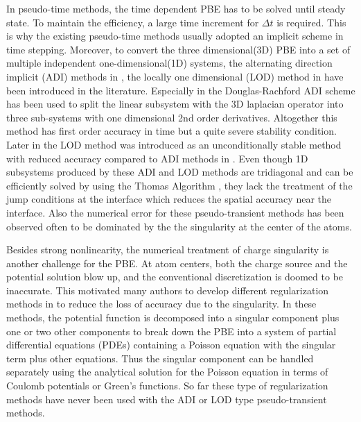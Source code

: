 In pseudo-time methods, the time dependent PBE has to be solved until steady state. To maintain the efficiency, a large time increment for  $\Delta t$ is required. This is why the existing pseudo-time methods usually adopted an implicit scheme in time stepping. Moreover, to convert the three dimensional(3D) PBE into a set of multiple independent one-dimensional(1D) systems, the alternating direction implicit (ADI) methods in \cite{Geng2013_tree,Geng2013_Fully}, the locally one dimensional (LOD) method in \cite{Wilson2016} have been introduced in the literature. Especially in \cite{Geng2013_Fully} the Douglas-Rachford ADI scheme has been used to split the linear subsystem with the 3D laplacian operator into three sub-systems with one dimensional 2nd order derivatives. Altogether this method has first order accuracy in time but a quite severe stability condition. Later in \cite{Wilson2016} the LOD method was introduced as an unconditionally stable method with reduced accuracy compared to ADI methods in \cite{Geng2013_Fully}. Even though 1D subsystems produced by these ADI and LOD methods are tridiagonal and can be efficiently solved by using the Thomas Algorithm \cite{FD_PDE}, they lack the treatment of the jump conditions at the interface which reduces the spatial accuracy near the interface. Also the numerical error for these pseudo-transient methods has been observed often to be dominated by the the singularity at the center of the atoms.

Besides strong nonlinearity, the numerical treatment of charge singularity is another challenge for the PBE. At atom centers, both the charge source and the potential solution blow up, and the conventional discretization is doomed to be inaccurate. This motivated many authors to develop different regularization methods in \cite{Cai2009,Chen2007, Geng2007,Holst2010,XIE2014,Zhou_1996,Geng2017a} to reduce the loss of accuracy due to the singularity. In these methods, the potential function is decomposed into a singular component plus one or two other components to break down the PBE into a system of partial differential equations (PDEs) containing a Poisson equation with the singular term plus other equations. Thus the singular component can be handled separately using the analytical solution for the Poisson equation in terms of Coulomb potentials or Green's functions. So far these type of regularization methods have never been used with the ADI or LOD type pseudo-transient methods. 

